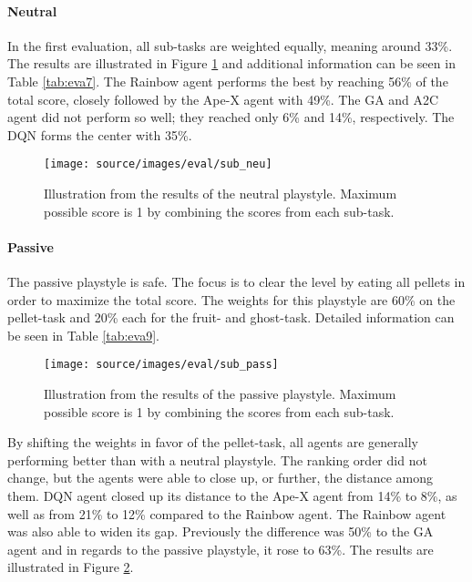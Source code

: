 \paragraph{Neutral}
In the first evaluation, all sub-tasks are weighted equally, meaning around 33\%. The results are illustrated in Figure \ref{fig:sub_neu} and additional information can be seen in Table \ref{tab:eva7}. The Rainbow agent performs the best by reaching 56\% of the total score, closely followed by the Ape-X agent with 49\%. The GA and A2C agent did not perform so well; they reached only 6\% and 14\%, respectively. The DQN forms the center with 35\%.

\begin{figure}%
\centering
\texttt{[image: source/images/eval/sub\_neu]}%
\caption[Illustration from the results of the neutral playstyle]{Illustration from the results of the neutral playstyle. Maximum possible score is 1 by combining the scores from each sub-task.}%
\label{fig:sub_neu}%
\end{figure} 

\paragraph{Passive}
The passive playstyle is safe. The focus is to clear the level by eating all pellets in order to maximize the total score. The weights for this playstyle are 60\% on the pellet-task and 20\% each for the fruit- and ghost-task. Detailed information can be seen in Table \ref{tab:eva9}. 
\begin{figure}[H]%
\centering
\texttt{[image: source/images/eval/sub\_pass]}%
\caption[Illustration from the results of the passive playstyle]{Illustration from the results of the passive playstyle. Maximum possible score is 1 by combining the scores from each sub-task.}%
\label{fig:sub_pass}%
\end{figure}
By shifting the weights in favor of the pellet-task, all agents are generally performing better than with a neutral playstyle. The ranking order did not change, but the agents were able to close up, or further, the distance among them. DQN agent closed up its distance to the Ape-X agent from 14\% to 8\%, as well as from 21\% to 12\% compared to the Rainbow agent. The Rainbow agent was also able to widen its gap. Previously the difference was 50\% to the GA agent and in regards to the passive playstyle, it rose to 63\%. The results are illustrated in Figure \ref{fig:sub_pass}.

